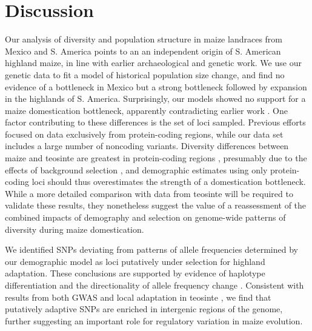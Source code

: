 \section*{Discussion}

Our analysis of diversity and population structure in maize landraces from Mexico and S. America points to an  an independent origin of S. American highland maize, in line with earlier archaeological \cite[]{Piperno_2006_69,Perry_2006_16511492,Grobman_2012_22307642} and genetic \citep{vanHeerwaarden_2011_21189301} work. 
We use our genetic data to fit a model of historical population size change, and find no evidence of a bottleneck in Mexico but a strong bottleneck followed by expansion in the highlands of S. America. 
Surprisingly, our models showed no support for a maize domestication bottleneck, apparently contradicting earlier work \cite[]{Eyre-Walker_1998_9539756,Tenaillon_2004_15014173,Wright_2005_15919994}. 
One factor contributing to these differences is the set of loci sampled. 
Previous efforts focused on data exclusively from protein-coding regions, while our data set includes a large number of noncoding variants.
Diversity differences between maize and teosinte are greatest in protein-coding regions \citep{Hufford_2012_22660546}, presumably due to the effects of background selection \citep{}, and demographic estimates using only protein-coding loci should thus overestimates the strength of a domestication bottleneck.
While a more detailed comparison with data from teosinte will be required to validate these results, they nonetheless suggest the value of a reassessment of the combined impacts of demography and selection on genome-wide patterns of diversity during maize domestication.

We identified SNPs deviating from patterns of allele frequencies determined by our demographic model as loci putatively under selection for highland adaptation.
These conclusions are supported by evidence of haplotype differentiation  and the directionality of allele frequency change .
Consistent with results from both GWAS \citep{Wallace} and local adaptation in teosinte \citep{Pyhajarvi2013}, we find that putatively adaptive SNPs are enriched in intergenic regions of the genome, further suggesting an important role for regulatory variation in maize evolution. 

